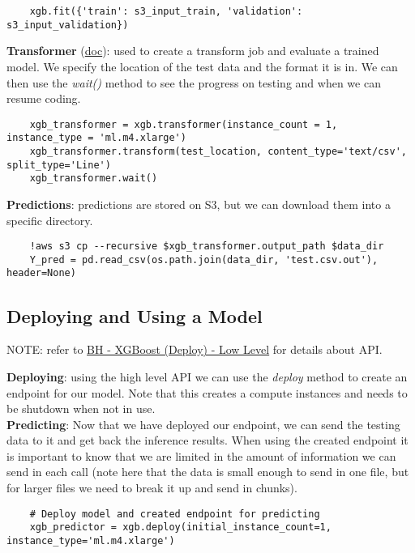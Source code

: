 \documentclass[11pt, a4paper]{article}
\begin{document}
\begin{spacing}{1.1}
\begin{lstlisting}
	xgb.fit({'train': s3_input_train, 'validation': s3_input_validation})
	\end{lstlisting} \vspace*{2mm}
	\textbf{Transformer} (\href{https://sagemaker.readthedocs.io/en/latest/transformer.html}{doc}): used to create a transform job and evaluate a trained model. We specify the location of the test data and the format it is in. We can then use the \textit{wait()} method to see the progress on testing and when we can resume coding. 
	\begin{lstlisting}
	xgb_transformer = xgb.transformer(instance_count = 1, instance_type = 'ml.m4.xlarge')
	xgb_transformer.transform(test_location, content_type='text/csv', split_type='Line')
	xgb_transformer.wait()
	\end{lstlisting}\vspace*{2mm}
	\textbf{Predictions}: predictions are stored on S3, but we can download them into a specific directory.
	\begin{lstlisting}
	!aws s3 cp --recursive $xgb_transformer.output_path $data_dir
	Y_pred = pd.read_csv(os.path.join(data_dir, 'test.csv.out'), header=None)
	\end{lstlisting} \newpage
	
	\subsection{Deploying and Using a Model}
	\begin{center}
	\color{darkgray} NOTE: refer to \href{file:///E:/Documents/UdacityNotes/ML\%20Engineer/sample\_code/BH\%20-\%20XGBoost\%20(Deploy)\%20-\%20Low\%20Level.html}{BH - XGBoost (Deploy) - Low Level} for details about API. \color{black}
	\end{center}
	\textbf{Deploying}: using the high level API we can use the \textit{deploy} method to create an endpoint for our model. Note that this creates a compute instances and needs to be shutdown when not in use. \vspace*{2mm}\\
	\textbf{Predicting}: Now that we have deployed our endpoint, we can send the testing data to it and get back the inference results. When using the created endpoint it is important to know that we are limited in the amount of information we can send in each call (note here that the data is small enough to send in one file, but for larger files we need to break it up and send in chunks).
	\begin{lstlisting}
	# Deploy model and created endpoint for predicting
	xgb_predictor = xgb.deploy(initial_instance_count=1, instance_type='ml.m4.xlarge')
	

\end{lstlisting}
\end{spacing}
\end{document}
